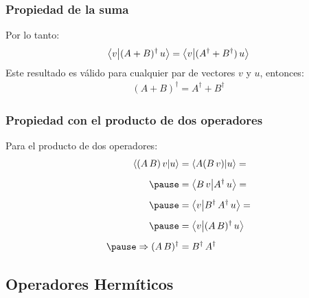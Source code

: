 \documentclass[12pt]{beamer}
\begin{document}
\begin{frame}
\frametitle{Propiedad de la suma}
Por lo tanto:
\pause
\begin{align*}
\braket{v}{(A + B)^{\dagger} \, u} = \braket{v}{(A^{\dagger} + B^{\dagger}) \, u}
\end{align*}
\pause
Este resultado es válido para cualquier par de vectores $v$ y $u$, entonces:
\pause
\begin{align*}
(A + B)^{\dagger}  = A^{\dagger} + B^{\dagger}
\end{align*}    
\end{frame}
\begin{frame}
\frametitle{Propiedad con el producto de dos operadores}
Para el producto de dos operadores:
\begin{eqnarray*}
\begin{aligned}
\braket{(A \, B) \, v}{u} &= \braket{A (B \, v)}{u} = \\[0.5em] \pause
&= \braket{ B \, v}{A^{\dagger} \, u} = \\[0.5em] \pause
&= \braket{v}{B^{\dagger} \, A^{\dagger} \, u} = \\[0.5em] \pause
&= \braket{v}{(A \, B)^{\dagger} \, u} \\[0.5em] \pause
\Rightarrow (A \, B)^{\dagger} &= B^{\dagger} \, A^{\dagger}
\end{aligned}
\end{eqnarray*}
\end{frame}

\subsection{Operadores Hermíticos}
\end{document}
